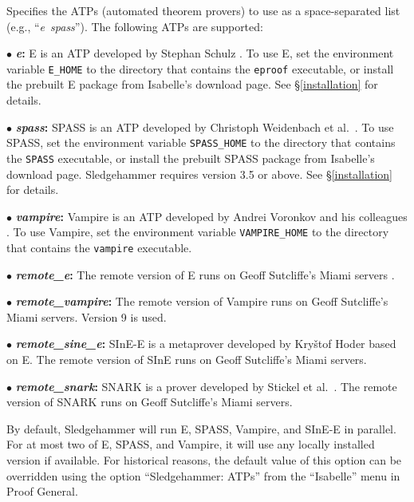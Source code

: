 \documentclass[a4paper,12pt]{article}
\begin{document}
\begin{enum}
Specifies the ATPs (automated theorem provers) to use as a space-separated list
(e.g., ``\textit{e}~\textit{spass}''). The following ATPs are supported:

\begin{enum}
\item[$\bullet$] \textbf{\textit{e}:} E is an ATP developed by Stephan Schulz
\cite{schulz-2002}. To use E, set the environment variable
\texttt{E\_HOME} to the directory that contains the \texttt{eproof} executable,
or install the prebuilt E package from Isabelle's download page. See
\S\ref{installation} for details.

\item[$\bullet$] \textbf{\textit{spass}:} SPASS is an ATP developed by Christoph
Weidenbach et al.\ \cite{weidenbach-et-al-2009}. To use SPASS, set the
environment variable \texttt{SPASS\_HOME} to the directory that contains the
\texttt{SPASS} executable, or install the prebuilt SPASS package from Isabelle's
download page. Sledgehammer requires version 3.5 or above. See
\S\ref{installation} for details.

\item[$\bullet$] \textbf{\textit{vampire}:} Vampire is an ATP developed by
Andrei Voronkov and his colleagues \cite{riazanov-voronkov-2002}. To use
Vampire, set the environment variable \texttt{VAMPIRE\_HOME} to the directory
that contains the \texttt{vampire} executable.

\item[$\bullet$] \textbf{\textit{remote\_e}:} The remote version of E runs
on Geoff Sutcliffe's Miami servers \cite{sutcliffe-2000}.

\item[$\bullet$] \textbf{\textit{remote\_vampire}:} The remote version of
Vampire runs on Geoff Sutcliffe's Miami servers. Version 9 is used.

\item[$\bullet$] \textbf{\textit{remote\_sine\_e}:} SInE-E is a metaprover
developed by Kry\v stof Hoder \cite{sine} based on E. The remote version of
SInE runs on Geoff Sutcliffe's Miami servers.

\item[$\bullet$] \textbf{\textit{remote\_snark}:} SNARK is a prover
developed by Stickel et al.\ \cite{snark}. The remote version of
SNARK runs on Geoff Sutcliffe's Miami servers.
\end{enum}

By default, Sledgehammer will run E, SPASS, Vampire, and SInE-E in parallel.
For at most two of E, SPASS, and Vampire, it will use any locally installed
version if available. For historical reasons, the default value of this option
can be overridden using the option ``Sledgehammer: ATPs'' from the ``Isabelle''
menu in Proof General.


\end{enum}
\end{document}
